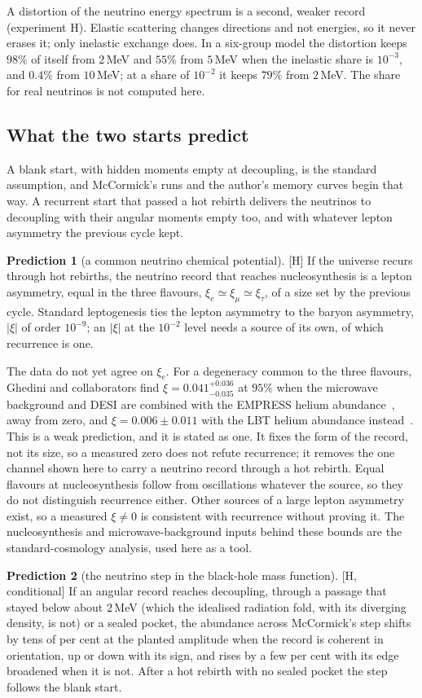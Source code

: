 \documentclass[11pt]{article}
\theoremstyle{definition}\newtheorem{hypothesis}{Hypothesis}\newtheorem{prediction}{Prediction}
\theoremstyle{remark}\newtheorem{remark}[theorem]{Remark}
\newcommand{\grade}[1]{\textsf{\small[#1]}}
\begin{document}
A distortion of the neutrino energy spectrum is a second, weaker record (experiment H). Elastic scattering changes directions and not energies, so it never erases it; only inelastic exchange does. In a six-group model the distortion keeps $98\%$ of itself from $2$\,MeV and $55\%$ from $5$\,MeV when the inelastic share is $10^{-3}$, and $0.4\%$ from $10$\,MeV; at a share of $10^{-2}$ it keeps $79\%$ from $2$\,MeV. The share for real neutrinos is not computed here.

\subsection{What the two starts predict}
A blank start, with hidden moments empty at decoupling, is the standard assumption, and McCormick's runs and the author's memory curves begin that way. A recurrent start that passed a hot rebirth delivers the neutrinos to decoupling with their angular moments empty too, and with whatever lepton asymmetry the previous cycle kept.
\begin{prediction}[a common neutrino chemical potential]\label{pred:xi}\grade{H}
If the universe recurs through hot rebirths, the neutrino record that reaches nucleosynthesis is a lepton asymmetry, equal in the three flavours, $\xi_e\simeq\xi_\mu\simeq\xi_\tau$, of a size set by the previous cycle. Standard leptogenesis ties the lepton asymmetry to the baryon asymmetry, $|\xi|$ of order $10^{-9}$; an $|\xi|$ at the $10^{-2}$ level needs a source of its own, of which recurrence is one.
\end{prediction}
The data do not yet agree on $\xi_e$. For a degeneracy common to the three flavours, Ghedini and collaborators find $\xi=0.041^{+0.036}_{-0.035}$ at $95\%$ when the microwave background and DESI are combined with the EMPRESS helium abundance~\cite{EMPRESS}, away from zero, and $\xi=0.006\pm0.011$ with the LBT helium abundance instead~\cite{Ghedini}. This is a weak prediction, and it is stated as one. It fixes the form of the record, not its size, so a measured zero does not refute recurrence; it removes the one channel shown here to carry a neutrino record through a hot rebirth. Equal flavours at nucleosynthesis follow from oscillations whatever the source, so they do not distinguish recurrence either. Other sources of a large lepton asymmetry exist, so a measured $\xi\ne0$ is consistent with recurrence without proving it. The nucleosynthesis and microwave-background inputs behind these bounds are the standard-cosmology analysis, used here as a tool.
\begin{prediction}[the neutrino step in the black-hole mass function]\label{pred:mf}\grade{H, conditional}
If an angular record reaches decoupling, through a passage that stayed below about $2$\,MeV (which the idealised radiation fold, with its diverging density, is not) or a sealed pocket, the abundance across McCormick's step shifts by tens of per cent at the planted amplitude when the record is coherent in orientation, up or down with its sign, and rises by a few per cent with its edge broadened when it is not. After a hot rebirth with no sealed pocket the step follows the blank start.
\end{prediction}
\end{document}
